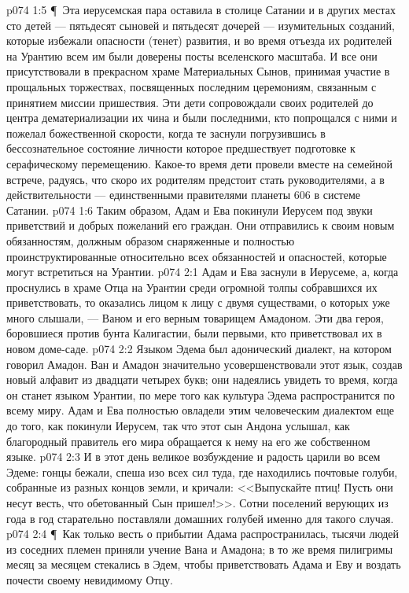 \vs p074 1:5 \P\ Эта иерусемская пара оставила в столице Сатании и в других местах сто детей --- пятьдесят сыновей и пятьдесят дочерей --- изумительных созданий, которые избежали опасности (тенет) развития, и во время отъезда их родителей на Урантию всем им были доверены посты вселенского масштаба. И все они присутствовали в прекрасном храме Материальных Сынов, принимая участие в прощальных торжествах, посвященных последним церемониям, связанным с принятием миссии пришествия. Эти дети сопровождали своих родителей до центра дематериализации их чина и были последними, кто попрощался с ними и пожелал божественной скорости, когда те заснули погрузившись в бессознательное состояние личности которое предшествует подготовке к серафическому перемещению. Какое\hyp{}то время дети провели вместе на семейной встрече, радуясь, что скоро их родителям предстоит стать руководителями, а в действительности --- единственными правителями планеты 606 в системе Сатании.
\vs p074 1:6 Таким образом, Адам и Ева покинули Иерусем под звуки приветствий и добрых пожеланий его граждан. Они отправились к своим новым обязанностям, должным образом снаряженные и полностью проинструктированные относительно всех обязанностей и опасностей, которые могут встретиться на Урантии.
\vs p074 2:1 Адам и Ева заснули в Иерусеме, а, когда проснулись в храме Отца на Урантии среди огромной толпы собравшихся их приветствовать, то оказались лицом к лицу с двумя существами, о которых уже много слышали, --- Ваном и его верным товарищем Амадоном. Эти два героя, боровшиеся против бунта Калигастии, были первыми, кто приветствовал их в новом доме\hyp{}саде.
\vs p074 2:2 Языком Эдема был адонический диалект, на котором говорил Амадон. Ван и Амадон значительно усовершенствовали этот язык, создав новый алфавит из двадцати четырех букв; они надеялись увидеть то время, когда он станет языком Урантии, по мере того как культура Эдема распространится по всему миру. Адам и Ева полностью овладели этим человеческим диалектом еще до того, как покинули Иерусем, так что этот сын Андона услышал, как благородный правитель его мира обращается к нему на его же собственном языке.
\vs p074 2:3 И в этот день великое возбуждение и радость царили во всем Эдеме: гонцы бежали, спеша изо всех сил туда, где находились почтовые голуби, собранные из разных концов земли, и кричали: <<Выпускайте птиц! Пусть они несут весть, что обетованный Сын пришел!>>. Сотни поселений верующих из года в год старательно поставляли домашних голубей именно для такого случая.
\vs p074 2:4 \P\ Как только весть о прибытии Адама распространилась, тысячи людей из соседних племен приняли учение Вана и Амадона; в то же время пилигримы месяц за месяцем стекались в Эдем, чтобы приветствовать Адама и Еву и воздать почести своему невидимому Отцу.
